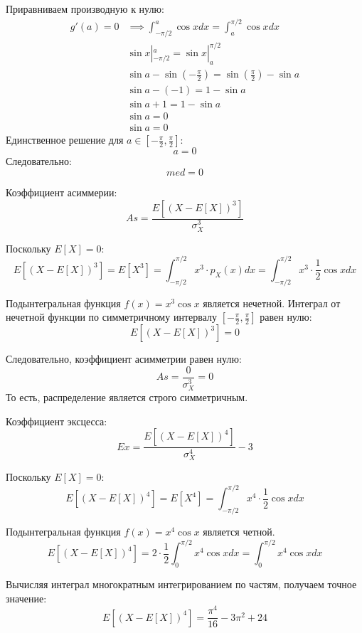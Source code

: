 \documentclass[a4paper,14pt]{extarticle}
\begin{document}
        Приравниваем производную к нулю:
        \begin{align*}
        g'(a) = 0 &\implies \int_{-\pi/2}^{a} \cos x dx = \int_{a}^{\pi/2} \cos x dx \\
        & \sin x|_{-\pi/2}^{a} = \sin x|_{a}^{\pi/2} \\
        & \sin a - \sin\left(-\frac{\pi}{2}\right) = \sin\left(\frac{\pi}{2}\right) - \sin a \\
        & \sin a - (-1) = 1 - \sin a \\
        & \sin a + 1 = 1 - \sin a \\
        &   \sin a = 0 \\
        & \sin a = 0
        \end{align*}
        Единственное решение для $a \in \left[-\frac{\pi}{2}, \frac{\pi}{2}\right]$:
        $$
        a = 0
        $$
        Следовательно:
        $$
        \boxed{med = 0}
        $$

        Коэффициент асиммерии:
        $$
        As = \frac{E[(X - E[X])^3]}{\sigma_X^3}
        $$

        Поскольку $E[X] = 0$:
        $$
        E[(X - E[X])^3] = E[X^3] = \int_{-\pi/2}^{\pi/2} x^3 \cdot p_X(x) dx = \int_{-\pi/2}^{\pi/2} x^3 \cdot \frac{1}{2} \cos x dx
        $$

        Подынтегральная функция $f(x) = x^3 \cos x$ является нечетной.
        Интеграл от нечетной функции по симметричному интервалу $\left[-\frac{\pi}{2}, \frac{\pi}{2}\right]$ равен нулю:
        $$
        E[(X - E[X])^3] = 0
        $$

        Следовательно, коэффициент асимметрии равен нулю:
        $$
        \boxed{As = \frac{0}{\sigma_X^3} = 0}
        $$
        То есть, распределение является строго симметричным.

        Коэффициент эксцесса:
        $$
        Ex = \frac{E[(X - E[X])^4]}{\sigma_X^4} - 3
        $$

        Поскольку $E[X] = 0$:
        $$
        E[(X - E[X])^4] = E[X^4] = \int_{-\pi/2}^{\pi/2} x^4 \cdot \frac{1}{2} \cos x dx
        $$

        Подынтегральная функция $f(x) = x^4 \cos x$ является четной.
        $$
        E[(X - E[X])^4] = 2 \cdot \frac{1}{2} \int_{0}^{\pi/2} x^4 \cos x dx = \int_{0}^{\pi/2} x^4 \cos x dx
        $$

        Вычисляя интеграл многократным интегрированием по частям, получаем точное значение:
        $$
        E[(X - E[X])^4] = \frac{\pi^4}{16} - 3\pi^2 + 24
        $$
\end{document}
